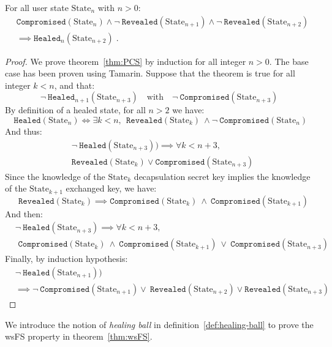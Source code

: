 \begin{theorem}
\label{thm:PCS}
For all user state $\text{State}_n$ with $n > 0$:
\begin{align*}
& \texttt{Compromised}(\text{State}_n) \land \lnot \ \texttt{Revealed}(\text{State}_{n+1}) \land \lnot \ \texttt{Revealed}(\text{State}_{n+2}) \\
& \implies \texttt{Healed}_{n}(\text{State}_{n+2}) \; .
\end{align*}
\end{theorem}
\begin{proof}
We prove theorem~\ref{thm:PCS} by induction for all integer $n > 0$. The base case has been proven using Tamarin. Suppose that the theorem is true for all integer $k < n$, and that: 
\[\lnot \ \texttt{Healed}_{n+1}(\text{State}_{n+3})\quad\mbox{with}\quad \lnot \ \texttt{Compromised}(\text{State}_{n+3})\] 
By definition of a healed state, for all $n > 2$ we have: 
\[\texttt{ Healed}(\text{State}_n) \iff \exists k<n,\ \  \texttt{Revealed}(\text{State}_k)\  \land \lnot \ \texttt{Compromised}(\text{State}_n) \]
And thus:
\[
\begin{split}
&\lnot \ \texttt{Healed}(\text{State}_{n+3})) \implies \forall k<n+3, \\ 
&\texttt{Revealed}(\text{State}_k) \lor  \texttt{Compromised}(\text{State}_{n+3})
\end{split}
\]
Since the knowledge of the $\text{State}_k$ decapsulation secret key implies the knowledge of the $\text{State}_{k+1}$ exchanged key, we have:
\[\quad \texttt{Revealed}(\text{State}_k) \implies \texttt{Compromised}(\text{State}_k)\ \land \  \texttt{Compromised}(\text{State}_{k+1})\]
And then:
\[
\begin{split}
& \lnot \ \texttt{Healed}(\text{State}_{n+3}) \implies \forall k<n+3,\\  
& \texttt{ Compromised}(\text{State}_k)\ \land \  \texttt{Compromised}(\text{State}_{k+1})\ \lor \  \texttt{Compromised}(\text{State}_{n+3})
\end{split}
\]
Finally, by induction hypothesis: 
\[
\begin{split}
& \lnot \ \texttt{Healed}(\text{State}_{n+1})) \\
&\implies \lnot \ \texttt{Compromised}(\text{State}_{n+1}) \lor \ \texttt{Revealed}(\text{State}_{n+2}) 
\lor \texttt{Revealed}(\text{State}_{n+3})
\end{split}
\]
\end{proof}

We introduce the notion of \emph{healing ball} in definition~\ref{def:healing-ball} to prove the wsFS property in theorem~\ref{thm:wsFS}.

